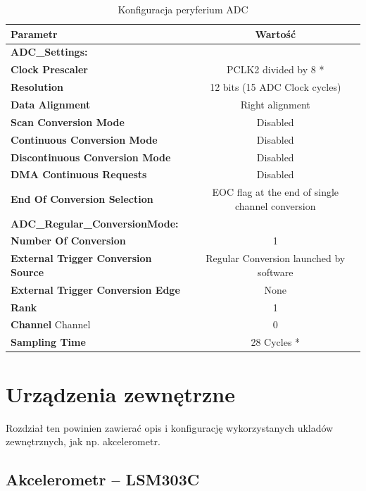 \documentclass[10pt, a4paper]{article}
\begin{document}
\begin{table}[H]
	\centering
	\begin{tabular}{|l|c|} \hline
		\textbf{Parametr} & Wartość \\
 \hline 

\hline  \textbf{ADC{\_}Settings:}\\
\hline  \textbf{Clock Prescaler} &PCLK2 divided by 8 *\\
\hline  \textbf{Resolution }&12 bits (15 ADC Clock cycles)\\
\hline  \textbf{Data Alignment} &Right alignment\\
\hline  \textbf{Scan Conversion Mode}& Disabled\\
\hline  \textbf{Continuous Conversion Mode} &Disabled\\
\hline  \textbf{Discontinuous Conversion Mode}& Disabled\\
\hline  \textbf{DMA Continuous Requests}& Disabled\\
\hline  \textbf{End Of Conversion Selection}& EOC flag at the end of single channel conversion\\
\hline  \textbf{ADC{\_}Regular{\_}ConversionMode:}\\
\hline  \textbf{Number Of Conversion}& 1\\
\hline  \textbf{External Trigger Conversion Source }&Regular Conversion launched by software\\
\hline  \textbf{External Trigger Conversion Edge}& None\\
\hline  \textbf{Rank} &1\\
\hline  \textbf{Channel }Channel &0\\
\hline  \textbf{Sampling Time} &28 Cycles *\\
 \hline 
	\end{tabular}
	\caption{Konfiguracja peryferium ADC}
	\label{tab:USART}
\end{table}

\section{Urządzenia zewnętrzne}

Rozdział ten powinien zawierać opis i konfigurację wykorzystanych ukladów
zewnętrznych, jak np. akcelerometr.

\subsection{Akcelerometr -- LSM303C}
\end{document}
